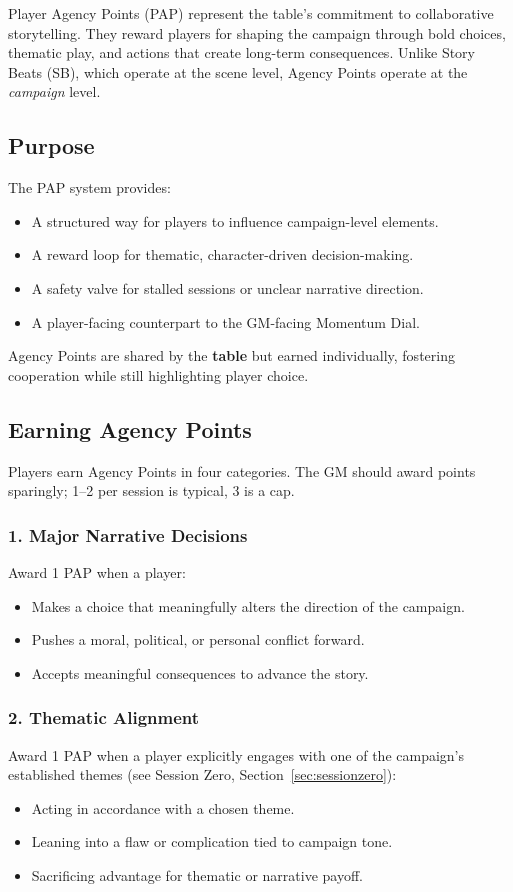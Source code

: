 \documentclass[11pt]{article}
\begin{document}
Player Agency Points (PAP) represent the table's commitment to collaborative storytelling. 
They reward players for shaping the campaign through bold choices, thematic play, and 
actions that create long-term consequences. Unlike Story Beats (SB), which operate at the 
scene level, Agency Points operate at the \emph{campaign} level.

\subsection{Purpose}
The PAP system provides:
\begin{itemize}
    \item A structured way for players to influence campaign-level elements.
    \item A reward loop for thematic, character-driven decision-making.
    \item A safety valve for stalled sessions or unclear narrative direction.
    \item A player-facing counterpart to the GM-facing Momentum Dial.
\end{itemize}

Agency Points are shared by the \textbf{table} but earned individually, fostering 
cooperation while still highlighting player choice.

\subsection{Earning Agency Points}

Players earn Agency Points in four categories. The GM should award points sparingly; 1--2 
per session is typical, 3 is a cap.

\subsubsection{1. Major Narrative Decisions}
Award 1 PAP when a player:
\begin{itemize}
    \item Makes a choice that meaningfully alters the direction of the campaign.
    \item Pushes a moral, political, or personal conflict forward.
    \item Accepts meaningful consequences to advance the story.
\end{itemize}

\subsubsection{2. Thematic Alignment}
Award 1 PAP when a player explicitly engages with one of the campaign's established themes 
(see Session Zero, Section~\ref{sec:sessionzero}):
\begin{itemize}
    \item Acting in accordance with a chosen theme.
    \item Leaning into a flaw or complication tied to campaign tone.
    \item Sacrificing advantage for thematic or narrative payoff.
\end{itemize}
\end{document}
